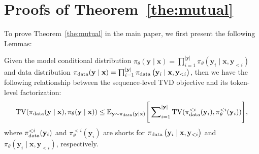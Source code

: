 \newpage
\appendix
\section{Proofs of Theorem~\ref{the:mutual}}
\label{app:proof}
To prove Theorem~\ref{the:mutual} in the main paper, we first present the following  Lemmas:

\begin{lemma}\label{lemma:1}
Given the model conditional distribution $\pi_{\theta}(\mathbf{y} \mid \mathbf{x})=\prod_{i=1}^{|\mathbf{y}|} \pi_\theta\left(\mathbf{y}_i \mid \mathbf{x}, \mathbf{y}_{<i}\right)$ and  data distribution $\pi_{\rm{data}}(\mathbf{y} \mid \mathbf{x})=\prod_{i=1}^{|\mathbf{y}|} \pi_{\rm{data}}\left(\mathbf{y}_i \mid \mathbf{x}, \mathbf{y}_{<i}\right)$, then we have the following relationship between the sequence-level TVD objective and its token-level factorization:
   \begin{equation}
    {\mathrm{TV}}(\pi_{\rm{data}}(\mathbf{y} \mid \mathbf{x}), \pi_{\theta}(\mathbf{y} \mid \mathbf{x})) \le \mathbb{E}_{\mathbf{y}\sim \pi_{\rm{data}}(\mathbf{y} \mid \mathbf{x})}\Bigg[\sum\nolimits_{i=1}^{|\mathbf{y}|} {\mathrm{TV}}(\pi_{\rm{data}}^{<i}(\mathbf{y}_{i}), \pi_{\theta}^{<i}(\mathbf{y}_{i}))\Bigg],
\end{equation}
where $\pi_{\rm{data}}^{<i}(\mathbf{y}_{i})$ and $\pi_{\theta}^{<i}(\mathbf{y}_{i})$ are shorts for $\pi_{\rm{data}}\left(\mathbf{y}_i \mid \mathbf{x}, \mathbf{y}_{<i}\right)$ and  $\pi_\theta\left(\mathbf{y}_i \mid \mathbf{x}, \mathbf{y}_{<i}\right)$, respectively.
\end{lemma}
